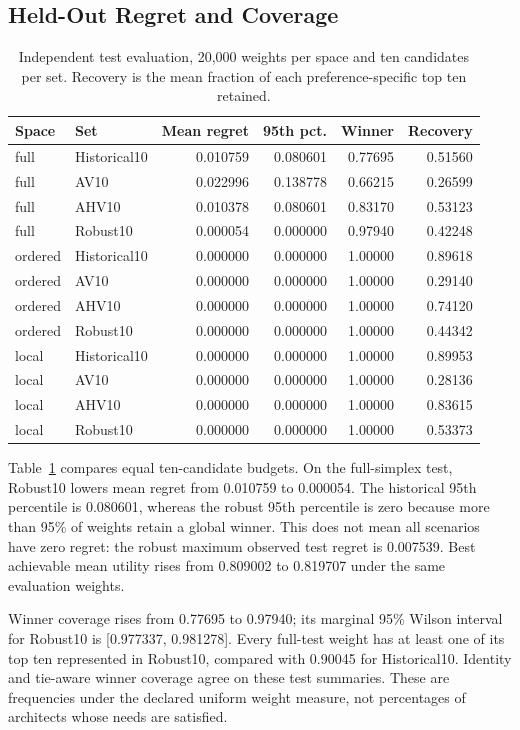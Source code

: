 \documentclass{llncs}
\begin{document}
\subsection{Held-Out Regret and Coverage}
\begin{table}[tbp]\caption{Independent test evaluation, 20,000 weights per space and ten candidates per set. Recovery is the mean fraction of each preference-specific top ten retained.}\label{tab:evaluation}\centering
\small
\begin{tabular}{llrrrr}\toprule
Space & Set & Mean regret & 95th pct. & Winner & Recovery\\\midrule
full & Historical10 & 0.010759 & 0.080601 & 0.77695 & 0.51560\\
full & AV10 & 0.022996 & 0.138778 & 0.66215 & 0.26599\\
full & AHV10 & 0.010378 & 0.080601 & 0.83170 & 0.53123\\
full & Robust10 & 0.000054 & 0.000000 & 0.97940 & 0.42248\\
ordered & Historical10 & 0.000000 & 0.000000 & 1.00000 & 0.89618\\
ordered & AV10 & 0.000000 & 0.000000 & 1.00000 & 0.29140\\
ordered & AHV10 & 0.000000 & 0.000000 & 1.00000 & 0.74120\\
ordered & Robust10 & 0.000000 & 0.000000 & 1.00000 & 0.44342\\
local & Historical10 & 0.000000 & 0.000000 & 1.00000 & 0.89953\\
local & AV10 & 0.000000 & 0.000000 & 1.00000 & 0.28136\\
local & AHV10 & 0.000000 & 0.000000 & 1.00000 & 0.83615\\
local & Robust10 & 0.000000 & 0.000000 & 1.00000 & 0.53373\\
\bottomrule\end{tabular}

\end{table}


Table~\ref{tab:evaluation} compares equal ten-candidate budgets. On the full-simplex test, Robust10 lowers mean regret from 0.010759 to 0.000054. The historical 95th percentile is 0.080601, whereas the robust 95th percentile is zero because more than 95\% of weights retain a global winner. This does not mean all scenarios have zero regret: the robust maximum observed test regret is 0.007539. Best achievable mean utility rises from 0.809002 to 0.819707 under the same evaluation weights.

Winner coverage rises from 0.77695 to 0.97940; its marginal 95\% Wilson interval for Robust10 is [0.977337, 0.981278]. Every full-test weight has at least one of its top ten represented in Robust10, compared with 0.90045 for Historical10. Identity and tie-aware winner coverage agree on these test summaries. These are frequencies under the declared uniform weight measure, not percentages of architects whose needs are satisfied.
\end{document}
